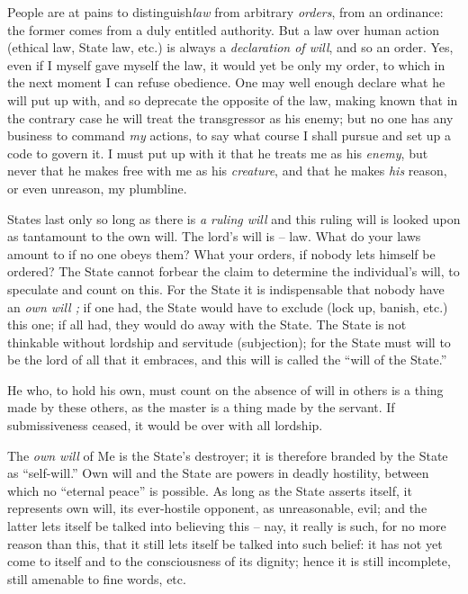 \documentclass[12pt,a4paper]{book}
\begin{document}
People are at pains to distinguish\textit{law} from arbitrary \textit{orders}, 
from an ordinance: the former comes from a duly entitled authority. But a law 
over human action (ethical law, State law, etc.) is always a 
\textit{declaration of will}, and so an order. Yes, even if I myself gave 
myself the law, it would yet be only my order, to which in the next moment I 
can refuse obedience. One may well enough declare what he will put up with, 
and so deprecate the opposite of the law, making known that in the contrary 
case he will treat the transgressor as his enemy; but no one has any business 
to command \textit{my} actions, to say what course I shall pursue and set up a 
code to govern it. I must put up with it that he treats me as his 
\textit{enemy}, but never that he makes free with me as his \textit{creature}, 
and that he makes \textit{his} reason, or even unreason, my plumbline.

States last only so long as there is \textit{a ruling will} and this ruling 
will is looked upon as tantamount to the own will. The lord's will is -- law. 
What do your laws amount to if no one obeys them? What your orders, if nobody 
lets himself be ordered? The State cannot forbear the claim to determine the 
individual's will, to speculate and count on this. For the State it is 
indispensable that nobody have an \textit{own will ;} if one had, the State 
would have to exclude (lock up, banish, etc.) this one; if all had, they would 
do away with the State. The State is not thinkable without lordship and 
servitude (subjection); for the State must will to be the lord of all that it 
embraces, and this will is called the ``will of the State.''

He who, to hold his own, must count on the absence of will in others is a 
thing made by these others, as the master is a thing made by the servant. If 
submissiveness ceased, it would be over with all lordship.

The \textit{own will} of Me is the State's destroyer; it is therefore branded 
by the State as ``self-will.'' Own will and the State are powers in deadly 
hostility, between which no ``eternal peace'' is possible. As long as the 
State asserts itself, it represents own will, its ever-hostile opponent, as 
unreasonable, evil; and the latter lets itself be talked into believing this 
-- nay, it really is such, for no more reason than this, that it still lets 
itself be talked into such belief: it has not yet come to itself and to the 
consciousness of its dignity; hence it is still incomplete, still amenable to 
fine words, etc.
\end{document}
